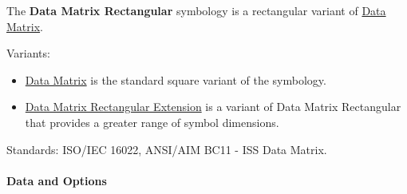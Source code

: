 The \textbf{Data Matrix Rectangular} symbology is a rectangular variant
of \protect\hyperlink{data-matrix}{Data Matrix}.

Variants:

\begin{itemize}
\tightlist
\item
  \protect\hyperlink{data-matrix}{Data Matrix} is the standard square
  variant of the symbology.
\item
  \protect\hyperlink{data-matrix-rectangular-extension}{Data Matrix
  Rectangular Extension} is a variant of Data Matrix Rectangular that
  provides a greater range of symbol dimensions.
\end{itemize}

Standards: ISO/IEC 16022, ANSI/AIM BC11 - ISS Data Matrix.

\hypertarget{data-and-options-10}{%
\paragraph{Data and Options}\label{data-and-options-10}}

